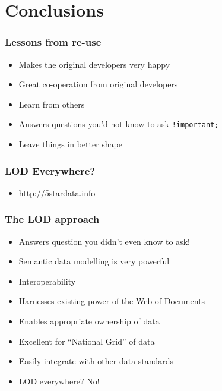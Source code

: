 \section{Conclusions}
\frame
{
  \frametitle{Lessons from re-use}
  \begin{itemize}
    \item Makes the original developers very happy
    \item Great co-operation from original developers
    \item Learn from others
    \item Answers questions you'd not know to ask \texttt{!important;}
    \item Leave things in better shape
  \end{itemize}
}
\frame
{
  \frametitle{LOD Everywhere?}
  \begin{center}
  \end{center}
  \begin{itemize}
    \item \url{http://5stardata.info}
  \end{itemize}
}
\frame
{
  \frametitle{The LOD approach}
  \begin{itemize}
    \item Answers question you didn't even know to ask!
    \item Semantic data modelling is very powerful
    \item Interoperability
    \item Harnesses existing power of the Web of Documents
    \item Enables appropriate ownership of data
    \item Excellent for ``National Grid'' of data
    \item Easily integrate with other data standards
    \item LOD everywhere? No!
  \end{itemize}
}
